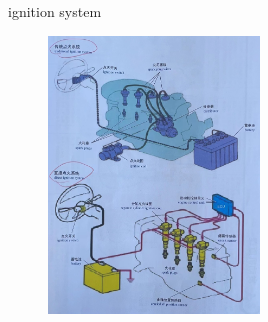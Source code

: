 \begin{frame}
	\begin{block}{ignition system}
		\begin{figure}[htbp]
			\centering
			\includegraphics[width=0.5\textwidth]{2-10}
		\end{figure}
	\end{block}
\end{frame}

